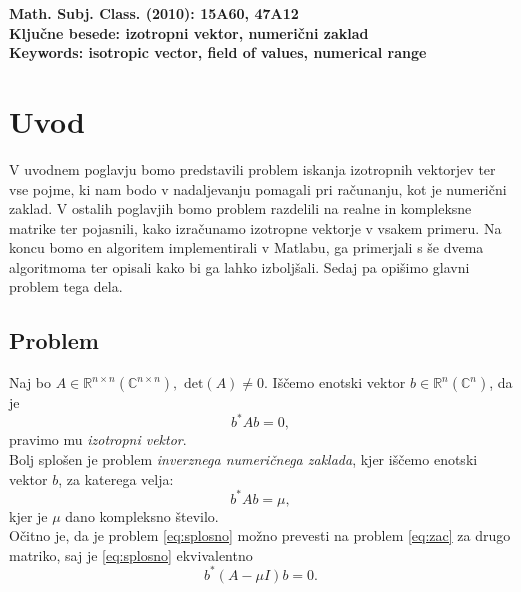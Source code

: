 \documentclass[12pt,a4paper]{amsart}
\theoremstyle{definition}
\theoremstyle{plain}
\newcommand{\R}{\mathbb R}
\newcommand{\C}{\mathbb C}
\begin{document}
\vfill\noindent
{\bf Math. Subj. Class. (2010): 15A60, 47A12}   \\[1mm]
{\bf Ključne besede: izotropni vektor, numerični zaklad}   \\[1mm]
{\bf Keywords: isotropic vector, field of values, numerical range}
\pagebreak


\section{Uvod}
V uvodnem poglavju bomo predstavili problem iskanja izotropnih vektorjev ter vse pojme, ki nam bodo v nadaljevanju pomagali pri računanju, kot je numerični zaklad. 
V ostalih poglavjih bomo problem razdelili na realne in kompleksne matrike ter pojasnili, kako izračunamo izotropne vektorje v vsakem primeru.
Na koncu bomo en algoritem implementirali v Matlabu, ga primerjali s še dvema algoritmoma ter opisali kako bi ga lahko izboljšali. Sedaj pa opišimo glavni problem tega dela.
\subsection{Problem}

Naj bo $A\in\R^{n\times n} (\C^{n\times n}),$ $\text{det}(A)\ne 0$. Iščemo enotski vektor $b\in\R^{n} (\C^{n})$, da je
\begin{equation}\label{eq:zac}
b^\ast Ab=0,
\end{equation}
pravimo mu \emph{izotropni vektor}. \\
Bolj splošen je problem \emph{inverznega numeričnega zaklada}, kjer iščemo enotski vektor $b$, za katerega velja:
\begin{equation}\label{eq:splosno}
b^\ast Ab=\mu,
\end{equation}
kjer je $\mu$ dano kompleksno število.\\
Očitno je, da je problem \eqref{eq:splosno} možno prevesti na problem \eqref{eq:zac} za drugo matriko, saj je \eqref{eq:splosno} ekvivalentno
$$b^\ast (A-\mu I)b=0.$$
\end{document}
